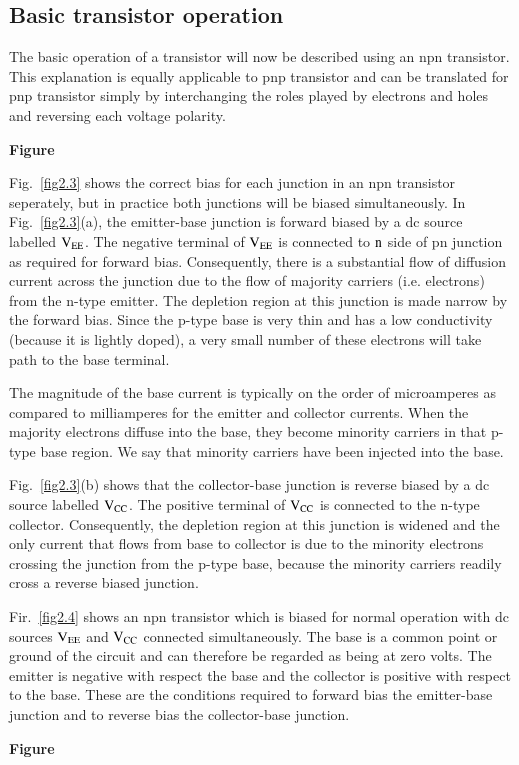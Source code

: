\subsection{Basic transistor operation}\label{sec2.1.1}

The basic operation of a transistor will now be described using an npn transistor. This explanation is equally applicable to pnp transistor and can be translated for pnp transistor simply by interchanging the roles played by electrons and holes and reversing each voltage polarity.
\begin{center}
{\bf Figure}
\end{center}

Fig.~\ref{fig2.3} shows the correct bias for each junction in an npn transistor seperately, but in practice both junctions will be biased simultaneously. In Fig.~\ref{fig2.3}(a), the emitter-base junction is forward biased by a dc source labelled $\textrm{V}_{\textrm{E}\textrm{E}}$. The negative terminal of $\textrm{V}_{\textrm{E}\textrm{E}}$ is connected to $\textrm{n}$ side of pn junction as required for forward bias. Consequently, there is a substantial flow of diffusion current across the junction due to the flow of majority carriers (i.e. electrons) from the n-type emitter. The depletion region at this junction is made narrow by the forward bias. Since the p-type base is very thin and has a low conductivity (because it is lightly doped), a very small number of these electrons will take path to the base terminal.

The magnitude of the base current is typically on the order of microamperes as compared to milliamperes for the emitter and collector currents. When the majority electrons diffuse into the base, they become minority carriers in that p-type base region. We say that minority carriers have been injected into the base.

Fig.~\ref{fig2.3}(b) shows that the collector-base junction is reverse biased by a dc source labelled $\textrm{V}_{\textrm{C}\textrm{C}}$. The positive terminal of $\textrm{V}_{\textrm{C}\textrm{C}}$ is connected to the n-type collector. Consequently, the depletion region at this junction is widened and the only current that flows from base to collector is due to the minority electrons crossing the junction from the p-type base, because the minority carriers readily cross a reverse biased junction.

Fir.~\ref{fig2.4} shows an npn transistor which is biased for normal operation with dc sources $\textrm{V}_{\textrm{E}\textrm{E}}$ and $\textrm{V}_{\textrm{C}\textrm{C}}$ connected simultaneously. The base is a common point or ground of the circuit and can therefore be regarded as being at zero volts. The emitter is negative with respect the base and the collector is positive with respect to the base. These are the conditions required to forward bias the emitter-base junction and to reverse bias the collector-base junction.
\begin{center}
{\bf Figure}
\end{center}

